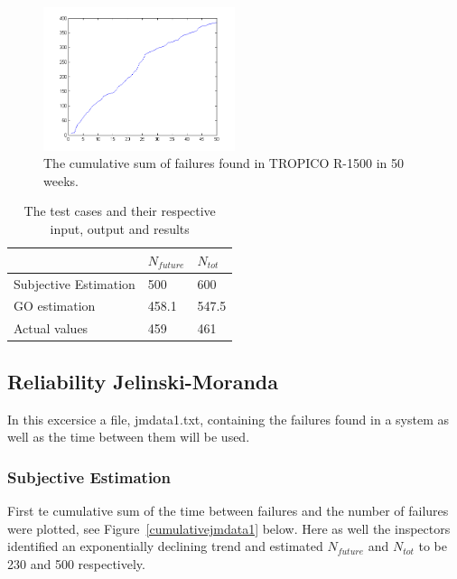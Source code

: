 \begin{figure}[htb!]
\begin{center}
	\includegraphics[width=0.5\textwidth]{cumsumgodata1plot.png}
\caption{The cumulative sum of failures found in TROPICO R-1500 in 50 weeks.}
\end{center}
\label{cumulativegodata1}
\end{figure}

\begin{table}[!htb]
	\centering
	\caption{The test cases and their respective input, output and results}
	\label{goelokumototable}	
    \begin{tabular}{|l|l|l|}
        \hline
        ~ & $N_{future}$ & $N_{tot}$ \\ \hline
        Subjective Estimation            & 500   & 600 		\\ 
        GO estimation                    & 458.1 & 547.5	\\ 
        Actual values                    & 459 	 & 461		\\ 
        \hline
    \end{tabular}
\end{table}

\subsection{Reliability Jelinski-Moranda}
In this excersice a file, jmdata1.txt, containing the failures found in a system as well as the time between them will be used.

\subsubsection*{Subjective Estimation} 
First te cumulative sum of the time between failures and the number of failures were plotted, see Figure~\ref{cumulativejmdata1} below. Here as well the inspectors identified an exponentially declining trend and estimated $N_{future}$ and $N_{tot}$ to be 230 and 500 respectively.

